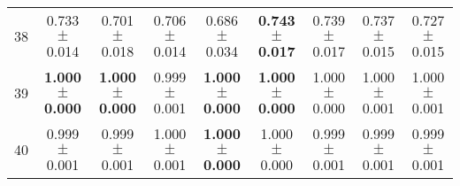 \begin{table}[!ht]
{\begin{tabular}{r c c c c c c c c}
38 & 0.733 $\pm$ 0.014 & 0.701 $\pm$ 0.018 & 0.706 $\pm$ 0.014 & 0.686 $\pm$ 0.034 & \textbf{0.743 $\pm$ 0.017} & 0.739 $\pm$ 0.017 & 0.737 $\pm$ 0.015 & 0.727 $\pm$ 0.015 \\
39 & \textbf{1.000 $\pm$ 0.000} & \textbf{1.000 $\pm$ 0.000} & 0.999 $\pm$ 0.001 & \textbf{1.000 $\pm$ 0.000} & \textbf{1.000 $\pm$ 0.000} & 1.000 $\pm$ 0.000 & 1.000 $\pm$ 0.001 & 1.000 $\pm$ 0.001 \\
40 & 0.999 $\pm$ 0.001 & 0.999 $\pm$ 0.001 & 1.000 $\pm$ 0.001 & \textbf{1.000 $\pm$ 0.000} & 1.000 $\pm$ 0.000 & 0.999 $\pm$ 0.001 & 0.999 $\pm$ 0.001 & 0.999 $\pm$ 0.001 \\
\end{tabular}}
\end{table}

